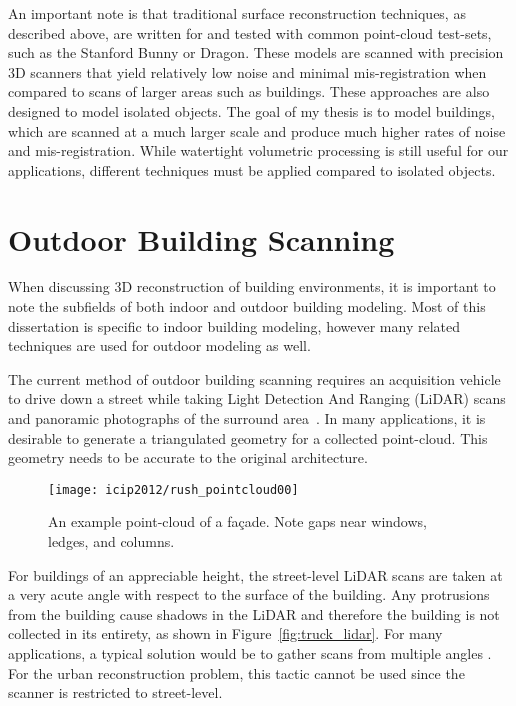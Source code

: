 \documentclass[12pt,onecolumn,oneside]{book}
\begin{document}
An important note is that traditional surface reconstruction techniques, as described above, are written for and tested with common point-cloud test-sets, such as the Stanford Bunny or Dragon.  These models are scanned with precision 3D scanners that yield relatively low noise and minimal mis-registration when compared to scans of larger areas such as buildings.  These approaches are also designed to model isolated objects.  The goal of my thesis is to model buildings, which are scanned at a much larger scale and produce much higher rates of noise and mis-registration.  While watertight volumetric processing is still useful for our applications, different techniques must be applied compared to isolated objects.

\section{Outdoor Building Scanning}
\label{sec:outdoor_scanning}

When discussing 3D reconstruction of building environments, it is important to note the subfields of both indoor and outdoor building modeling.  Most of this dissertation is specific to indoor building modeling, however many related techniques are used for outdoor modeling as well.

The current method of outdoor building scanning requires an acquisition vehicle to drive down a street while taking Light Detection And Ranging (LiDAR) scans and panoramic photographs of the surround area~\cite{Zakhor07,Chen07}.  In many applications, it is desirable to generate a triangulated geometry for a collected point-cloud.  This geometry needs to be accurate to the original architecture.  

\begin{figure}
	\begin{minipage}[b]{1.0\linewidth}
	  \centering
	  \centerline{\texttt{[image: icip2012/rush\_pointcloud00]}}
	\end{minipage}

	\caption[An example point-cloud of a fa\c{c}ade.]{An example point-cloud of a fa\c{c}ade. Note gaps near windows, ledges, and columns.}
	\label{fig:rush_points}
\end{figure}

For buildings of an appreciable height, the street-level LiDAR scans are taken at a very acute angle with respect to the surface of the building.  Any protrusions from the building cause shadows in the LiDAR and therefore the building is not collected in its entirety, as shown in Figure~\ref{fig:truck_lidar}.  For many applications, a typical solution would be to gather scans from multiple angles \cite{Tang10, Curless96}.  For the urban reconstruction problem, this tactic cannot be used since the scanner is restricted to street-level.
\end{document}
